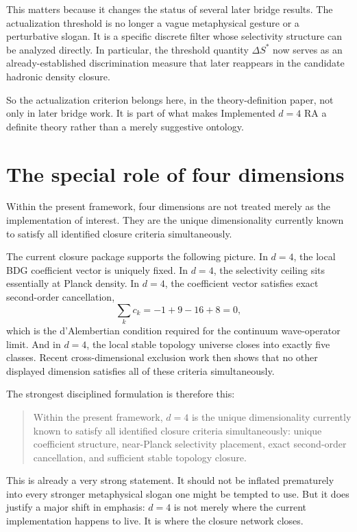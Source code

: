 \documentclass[11pt]{article}
\begin{document}
This matters because it changes the status of several later bridge results. The actualization threshold is no longer a vague metaphysical gesture or a perturbative slogan. It is a specific discrete filter whose selectivity structure can be analyzed directly. In particular, the threshold quantity $\Delta S^*$ now serves as an already-established discrimination measure that later reappears in the candidate hadronic density closure.

So the actualization criterion belongs here, in the theory-definition paper, not only in later bridge work. It is part of what makes Implemented $d=4$ RA a definite theory rather than a merely suggestive ontology.

\section{The special role of four dimensions}\label{sec:d4}
Within the present framework, four dimensions are not treated merely as the implementation of interest. They are the unique dimensionality currently known to satisfy all identified closure criteria simultaneously.

The current closure package supports the following picture. In $d=4$, the local BDG coefficient vector is uniquely fixed. In $d=4$, the selectivity ceiling sits essentially at Planck density. In $d=4$, the coefficient vector satisfies exact second-order cancellation,
\[
\sum_k c_k = -1 + 9 - 16 + 8 = 0,
\]
which is the d'Alembertian condition required for the continuum wave-operator limit. And in $d=4$, the local stable topology universe closes into exactly five classes. Recent cross-dimensional exclusion work then shows that no other displayed dimension satisfies all of these criteria simultaneously.

The strongest disciplined formulation is therefore this:
\begin{quote}
Within the present framework, $d=4$ is the unique dimensionality currently known to satisfy all identified closure criteria simultaneously: unique coefficient structure, near-Planck selectivity placement, exact second-order cancellation, and sufficient stable topology closure.
\end{quote}

This is already a very strong statement. It should not be inflated prematurely into every stronger metaphysical slogan one might be tempted to use. But it does justify a major shift in emphasis: $d=4$ is not merely where the current implementation happens to live. It is where the closure network closes.
\end{document}

